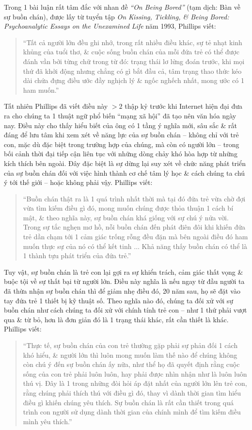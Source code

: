 \documentclass{article}
\begin{document}
\begin{enumerate}
	Trong 1 bài luận rất tâm đắc với nhan đề {\it``On Being Bored''} (tạm dịch: Bàn về sự buồn chán), được lấy từ tuyển tập {\it On Kissing, Tickling, \& Being Bored: Psychoanalytic Essays on the Unexamined Life} năm 1993, Phillips viết:
	\begin{quote}
		``Tất cả người lớn đều ghi nhớ, trong rất nhiều điều khác, sự tẻ nhạt kinh khủng của tuổi thơ, \& cuộc sống buồn chán của mỗi đứa trẻ có thể được đánh vần bởi từng chữ trong từ đó: trạng thái lơ lửng đoán trước, khi mọi thứ đã khởi động nhưng chẳng có gì bắt đầu cả, tâm trạng thao thức kéo dài chứa đựng điều ước đầy nghịch lý \& ngốc nghếch nhất, mong ước có 1 ham muốn.''
	\end{quote}
	Tất nhiên {\sc Phillips} đã viết điều này $> 2$ thập kỷ trước khi Internet hiện đại đưa ra cho chúng ta 1 thuật ngữ phổ biến ``mạng xã hội'' đã tạo nên văn hóa ngày nay. Điều này cho thấy hiểu biết của ông có 1 tầng ý nghĩa mới, sâu sắc \& rất đáng để lưu tâm khi xem xét về năng lực của sự buồn chán -- không chỉ với trẻ con, mặc dù đặc biệt trong trường hợp của chúng, mà còn có người lớn -- trong bối cảnh thời đại tiếp cận liên tục với những dòng chảy khó hòa hợp từ những kích thích bên ngoài. Đây đặc biệt là sự dừng lại suy xét về chức năng phát triển của sự buồn chán đối với việc hình thành cơ chế tâm lý học \& cách chúng ta chú ý tới thế giới -- hoặc không phải vậy. {\sc Phillips} viết:
	\begin{quote}
		``Buồn chán thật ra là 1 quá trình nhất thời mà tại đó đứa trẻ vừa chờ đợi vừa tìm kiếm điều gì đó, mong muốn chúng được thỏa thuận 1 cách bí mật, \& theo nghĩa này, sự buồn chán khá giống với sự chú ý nửa vời. Trong sự tắc nghẹn mơ hồ, nỗi buồn chán đến phát điên đôi khi khiến đứa trẻ dần chạm tới 1 cảm giác trống rỗng đều đặn mà bên ngoài điều đó ham muốn thực sự của nó có thể kết tinh $\ldots$ Khả năng thấy buồn chán có thể là 1 thành tựu phát triển của đứa trẻ.''
	\end{quote}
	Tuy vật, sự buồn chán là trẻ con lại gợi ra sự khiển trách, cảm giác thất vọng \& buộc tội về sự thất bại từ người lớn. Điều này nghĩa là nếu ngay từ đầu người ta đã thừa nhận sự buồn chán thì để giảm nhẹ điều đó, 20 năm sau, họ sẽ đặt vào tay đứa trẻ 1 thiết bị kỹ thuật số. Theo nghĩa nào đó, chúng ta đối xử với sự buồn chán như cách chúng ta đối xử với chính tính trẻ con -- như 1 thứ phải vượt qua \& từ bỏ, hơn là đơn giản đó là 1 trạng thái khác, rất cần thiết là khác. {\sc Phillips} viết:
	\begin{quote}
		``Thực tế, sự buồn chán của con trẻ thường gặp phải sự phản đối 1 cách khó hiểu, \& người lớn thì luôn mong muốn làm thế nào để chúng không còn chú ý đến sự buồn chán ấy nữa, như thể họ đã quyết định rằng cuộc sống của con trẻ phải luôn luôn, hay phải được nhìn nhận như là luôn luôn thú vị. Đây là 1 trong những đòi hỏi áp đặt nhất của người lớn lên trẻ con, rằng chúng phải thích thú với điều gì đó, thay vì dành thời gian tìm hiểu điều gì khiến chúng yêu thích. Sự buồn chán là rất cần thiết trong quá trình con người sử dụng dành thời gian của chính mình để tìm kiếm điều mình yêu thích.''
	\end{quote}
\end{enumerate}
\end{document}
